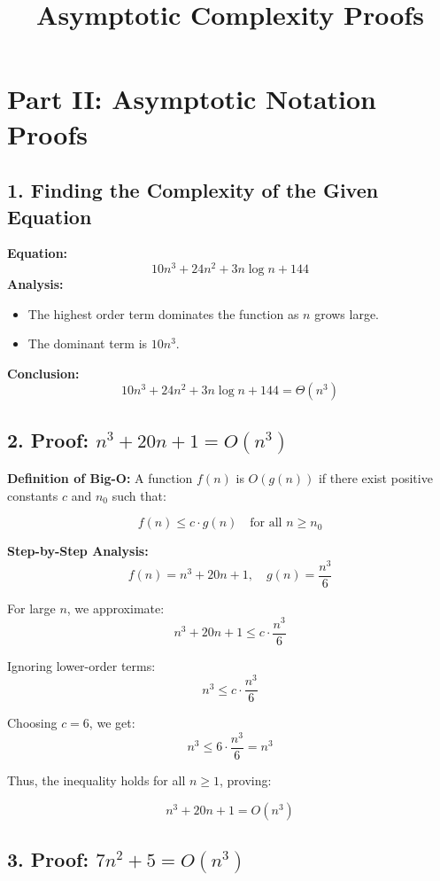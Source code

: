 \documentclass{article}
\begin{document}
\title{Asymptotic Complexity Proofs}
\author{}
\date{}
\maketitle

\section*{Part II: Asymptotic Notation Proofs}

\subsection*{1. Finding the Complexity of the Given Equation}
\textbf{Equation:}
\[
10n^3 + 24n^2 + 3n \log n + 144
\]
\textbf{Analysis:}
\begin{itemize}
    \item The highest order term dominates the function as \( n \) grows large.
    \item The dominant term is \( 10n^3 \).
\end{itemize}
\textbf{Conclusion:}
\[
10n^3 + 24n^2 + 3n \log n + 144 = \Theta(n^3)
\]

\subsection*{2. Proof: \( n^3 + 20n + 1 = O(n^3) \)}

\textbf{Definition of Big-O:}  
A function \( f(n) \) is \( O(g(n)) \) if there exist positive constants \( c \) and \( n_0 \) such that:

\[
f(n) \leq c \cdot g(n) \quad \text{for all } n \geq n_0
\]

\textbf{Step-by-Step Analysis:}
\[
f(n) = n^3 + 20n + 1, \quad g(n) = \frac{n^3}{6}
\]

For large \( n \), we approximate:
\[
n^3 + 20n + 1 \leq c \cdot \frac{n^3}{6}
\]

Ignoring lower-order terms:
\[
n^3 \leq c \cdot \frac{n^3}{6}
\]

Choosing \( c = 6 \), we get:
\[
n^3 \leq 6 \cdot \frac{n^3}{6} = n^3
\]

Thus, the inequality holds for all \( n \geq 1 \), proving:

\[
n^3 + 20n + 1 = O(n^3)
\]

\subsection*{3. Proof: \( 7n^2 + 5 = O(n^3) \)}
\end{document}
